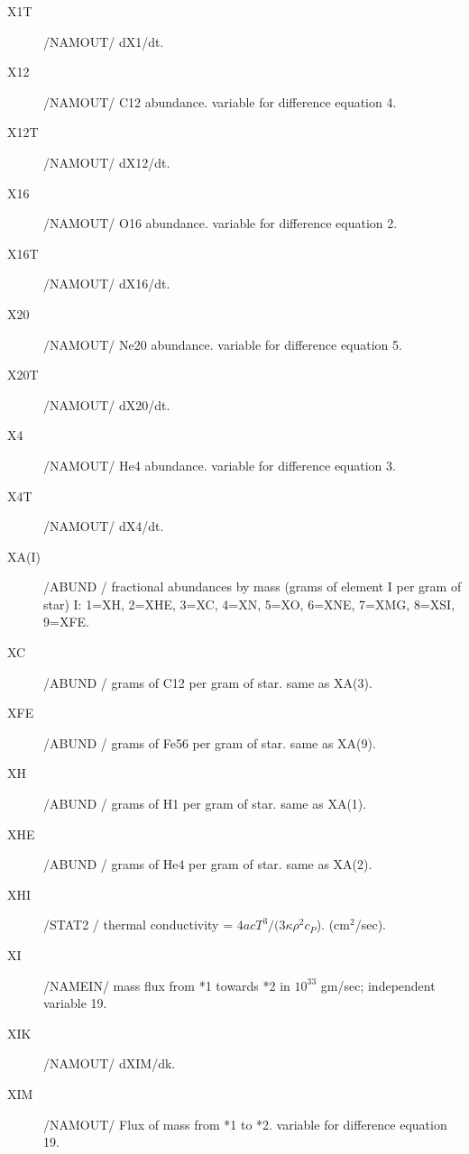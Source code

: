 \documentclass{article}
\begin{document}
\begin{description}
    \item[X1T]     	/NAMOUT/  dX1/dt.

    \item[X12]     	/NAMOUT/  C12 abundance. variable for difference equation 4.

    \item[X12T]    	/NAMOUT/  dX12/dt.

    \item[X16]     	/NAMOUT/  O16 abundance. variable for difference equation 2.

    \item[X16T]    	/NAMOUT/  dX16/dt.

    \item[X20]     	/NAMOUT/  Ne20 abundance. variable for difference equation 5.

    \item[X20T]    	/NAMOUT/  dX20/dt.

    \item[X4]      	/NAMOUT/  He4 abundance. variable for difference equation 3.

   	\item[X4T]     	/NAMOUT/  dX4/dt.

	\item[XA(I)]		/ABUND / fractional abundances by mass (grams of element I per gram of star)
				         I: 1=XH, 2=XHE, 3=XC, 4=XN, 5=XO, 6=XNE, 7=XMG, 8=XSI, 9=XFE.

	\item[XC]		    /ABUND / grams of C12 per gram of star. same as XA(3).

	\item[XFE	]	    /ABUND / grams of Fe56 per gram of star. same as XA(9).

	\item[XH]		    /ABUND / grams of H1 per gram of star. same as XA(1).

	\item[XHE]		    /ABUND / grams of He4 per gram of star. same as XA(2).

	\item[XHI]		    /STAT2 / thermal conductivity = $4 a c T^3/(3 \kappa \rho^2 c_P$). (cm$^2$/sec).
 
	\item[XI ]     	/NAMEIN/ mass flux from *1 towards *2 in $10^{33}$ gm/sec; independent variable 19.

	\item[XIK]     	/NAMOUT/ dXIM/dk.

	\item[XIM ]    	/NAMOUT/ Flux of mass from *1 to *2.  variable for difference equation 19.


\end{description}
\end{document}
